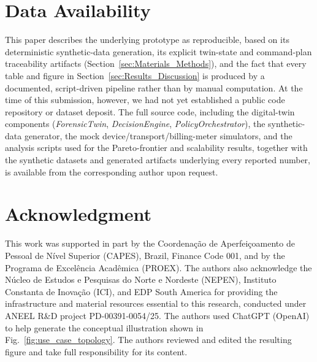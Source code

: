 \documentclass{ieeeaccess}
\begin{document}
\section*{Data Availability}
This paper describes the underlying prototype as reproducible, based on its deterministic synthetic-data generation, its explicit twin-state and command-plan traceability artifacts (Section~\ref{sec:Materials_Methods}), and the fact that every table and figure in Section~\ref{sec:Results_Discussion} is produced by a documented, script-driven pipeline rather than by manual computation. At the time of this submission, however, we had not yet established a public code repository or dataset deposit. The full source code, including the digital-twin components (\textit{ForensicTwin}, \textit{DecisionEngine}, \textit{PolicyOrchestrator}), the synthetic-data generator, the mock device/transport/billing-meter simulators, and the analysis scripts used for the Pareto-frontier and scalability results, together with the synthetic datasets and generated artifacts underlying every reported number, is available from the corresponding author upon request.

\section*{Acknowledgment}
This work was supported in part by the Coordenação de Aperfeiçoamento de Pessoal de Nível Superior (CAPES), Brazil, Finance Code 001, and by the Programa de Excelência Acadêmica (PROEX). The authors also acknowledge the Núcleo de Estudos e Pesquisas do Norte e Nordeste (NEPEN), Instituto Constanta de Inovação (ICI), and EDP South America for providing the infrastructure and material resources essential to this research, conducted under ANEEL R\&D project PD-00391-0054/25. The authors used ChatGPT (OpenAI) to help generate the conceptual illustration shown in Fig.~\ref{fig:use_case_topology}. The authors reviewed and edited the resulting figure and take full responsibility for its content.
\end{document}
